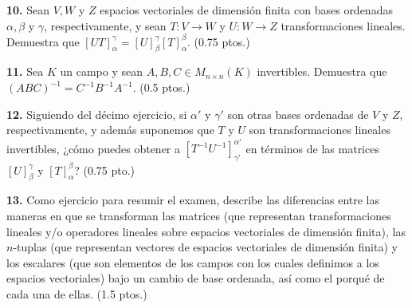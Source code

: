 \documentclass[a4paper]{article}
\begin{document}
\vspace{1cm}
\textbf{10.} Sean $V, W$ y $Z$ espacios vectoriales de dimensión finita con bases ordenadas $\alpha, \beta$ y $\gamma$, respectivamente, y sean $T:V\to W$ y $U:W\to Z$ transformaciones lineales. Demuestra que $[UT]_\alpha^\gamma=[U]_\beta^\gamma[T]_\alpha^\beta$. (0.75 ptos.)

\vspace{1cm}
\textbf{11.} Sea $K$ un campo y sean $A, B, C\in M_{n\times n}(K)$ invertibles. Demuestra que $(ABC)^{-1}=C^{-1}B^{-1}A^{-1}$. (0.5 ptos.)

\vspace{1cm}
\textbf{12.} Siguiendo del décimo ejercicio, si $\alpha'$ y $\gamma'$ son otras bases ordenadas de $V$ y $Z$, respectivamente, y además suponemos que $T$ y $U$ son transformaciones lineales invertibles, ¿cómo puedes obtener a $[T^{-1}U^{-1}]_{\gamma'}^{\alpha'}$ en términos de las matrices $[U]_\beta^\gamma$ y $[T]_\alpha^\beta$? (0.75 pto.)

\vspace{1cm}
\textbf{13.} Como ejercicio para resumir el examen, describe las diferencias entre las maneras en que se transforman las matrices (que representan transformaciones lineales y/o operadores lineales sobre espacios vectoriales de dimensión finita), las $n$-tuplas (que representan vectores de espacios vectoriales de dimensión finita) y los escalares (que son elementos de los campos con los cuales definimos a los espacios vectoriales) bajo un cambio de base ordenada, así como el porqué de cada una de ellas. (1.5 ptos.)
\end{document}
